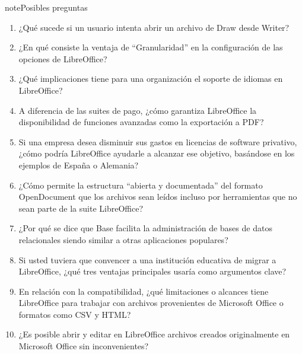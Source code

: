 \documentclass[letterpaper,10pt,spanish]{sphinxmanual}
\begin{document}
\begin{sphinxadmonition}{note}{Posibles preguntas}
\begin{enumerate}
\item {} 
\sphinxAtStartPar
¿Qué sucede si un usuario intenta abrir un archivo de Draw desde Writer?

\item {} 
\sphinxAtStartPar
¿En qué consiste la ventaja de “Granularidad” en la configuración de las opciones de LibreOffice?

\item {} 
\sphinxAtStartPar
¿Qué implicaciones tiene para una organización el soporte de idiomas en LibreOffice?

\item {} 
\sphinxAtStartPar
A diferencia de las suites de pago, ¿cómo garantiza LibreOffice la disponibilidad de funciones avanzadas como la exportación a PDF?

\item {} 
\sphinxAtStartPar
Si una empresa desea disminuir sus gastos en licencias de software privativo, ¿cómo podría LibreOffice ayudarle a alcanzar ese objetivo, basándose en los ejemplos de España o Alemania?

\item {} 
\sphinxAtStartPar
¿Cómo permite la estructura “abierta y documentada” del formato OpenDocument que los archivos sean leídos incluso por herramientas que no sean parte de la suite LibreOffice?

\item {} 
\sphinxAtStartPar
¿Por qué se dice que Base facilita la administración de bases de datos relacionales siendo similar a otras aplicaciones populares?

\item {} 
\sphinxAtStartPar
Si usted tuviera que convencer a una institución educativa de migrar a LibreOffice, ¿qué tres ventajas principales usaría como argumentos clave?

\item {} 
\sphinxAtStartPar
En relación con la compatibilidad, ¿qué limitaciones o alcances tiene LibreOffice para trabajar con archivos provenientes de Microsoft Office o formatos como CSV y HTML?

\item {} 
\sphinxAtStartPar
¿Es posible abrir y editar en LibreOffice archivos creados originalmente en Microsoft Office sin inconvenientes?

\end{enumerate}
\end{sphinxadmonition}

\sphinxstepscope
\end{document}

